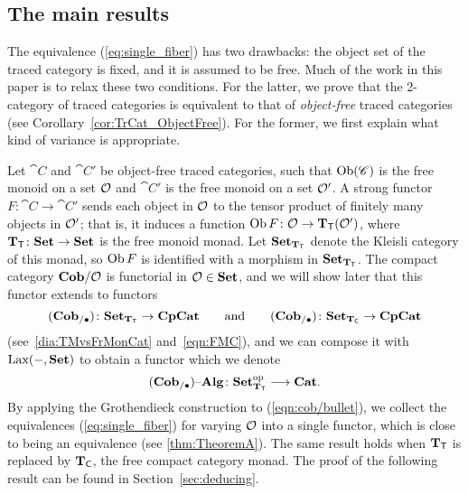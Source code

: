 \documentclass[12pt,oneside,article,draft]{memoir}
\begin{document}

\subsection{The main results}\label{subsec:main_results}

The equivalence (\ref{eq:single_fiber}) has two drawbacks: the object set of the traced category is
fixed, and it is assumed to be free. Much of the work in this paper is to relax these two
conditions. For the latter, we prove that the 2-category of traced categories is equivalent to that
of \emph{object-free} traced categories (see Corollary~\ref{cor:TrCat_ObjectFree}). For the former,
we first explain what kind of variance is appropriate.

Let $\cat{C}$ and $\cat{C}'$ be object-free traced categories, such that $\operatorname{Ob}(\mathscr{C})$ is the free
monoid on a set $\mathcal{O}$ and $\cat{C}'$ is the free monoid on a set $\mathcal{O}'$. A strong functor
$F\colon \cat{C}\to \cat{C'}$ sends each object in $\mathcal{O}$ to the tensor product of finitely many
objects in $\mathcal{O}'$; that is, it induces a function $\operatorname{Ob} F\colon\mathcal{O}\to\mathbf{T}_{\mathsf{T}}(\mathcal{O}')$, where
$\mathbf{T}_{\mathsf{T}}\colon\mathbf{Set}\to\mathbf{Set}$ is the free monoid monad. Let $\mathbf{Set}_{\mathbf{T}_{\mathsf{T}}}$ denote the Kleisli category of
this monad, so $\operatorname{Ob} F$ is identified with a morphism in $\mathbf{Set}_{\mathbf{T}_{\mathsf{T}}}$. The compact category $\mathbf{Cob}/\mathcal{O}$ is functorial in $\mathcal{O}\in\mathbf{Set}$, and we will show later that this functor extends to functors
$$(\mathbf{Cob}_{/\bullet})\colon\mathbf{Set}_{\mathbf{T}_{\mathsf{T}}}\to\mathbf{CpCat}\qquad\textnormal{and}\qquad(\mathbf{Cob}_{/\bullet})\colon\mathbf{Set}_{\mathbf{T}_{\mathsf{C}}}\to\mathbf{CpCat}$$ 
(see~\eqref{dia:TMvsFrMonCat} and~\eqref{eqn:FMC}),
%
and we can compose it with $\operatorname{Lax}(-,\mathbf{Set})$ to obtain a functor which we denote
\begin{equation}\label{eqn:cob/bullet}
  (\mathbf{Cob}_{/\bullet}){\text \textendash}\mathbf{Alg}\colon\mathbf{Set}_{\mathbf{T}_{\mathsf{T}}}^{\mathrm{op}}\longrightarrow\mathbf{Cat}.
\end{equation}
By applying the Grothendieck construction to (\ref{eqn:cob/bullet}), we collect the equivalences
(\ref{eq:single_fiber}) for varying $\mathcal{O}$ into a single functor, which is close to being an equivalence (see \ref{thm:TheoremA}). The same result holds when $\mathbf{T}_{\mathsf{T}}$ is replaced by $\mathbf{T}_{\mathsf{C}}$, the free compact category monad. The proof of the following result can be found in Section~\ref{sec:deducing}.
\end{document}
